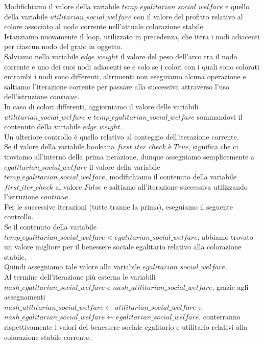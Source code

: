 Modifichiamo il valore della variabile $temp\_egalitarian\_social\_welfare$ e quello della variabile $utilitarian\_social\_welfare$ con il valore del profitto relativo al colore associato al nodo corrente nell'attuale colorazione stabile.\\

Istanziamo nuovamente il loop, utilizzato in precedenza, che itera i nodi adiacenti per ciascun nodo del grafo in oggetto.\\

Salviamo nella variabile $edge\_weight$ il valore del peso dell'arco tra il nodo corrente e uno dei suoi nodi adiacenti se e solo se i colori con i quali sono colorati entrambi i nodi sono differenti, altrimenti non eseguiamo alcuna operazione e saltiamo l'iterazione corrente per passare alla successiva attraverso l'uso dell'istruzione $continue$.\\
In caso di colori differenti, aggiorniamo il valore delle variabili \\
$utilitarian\_social\_welfare$ e $temp\_egalitarian\_social\_welfare$ sommandovi il contenuto della variabile $edge\_weight$.\\

Un ulteriore controllo è quello relativo al conteggio dell'iterazione corrente.\\
Se il valore della variabile booleana $first\_iter\_check$ è $True$, significa che ci troviamo all'interno della prima iterazione, dunque assegniamo semplicemente a $egalitarian\_social\_welfare$ il valore della variabile \\
$temp\_egalitarian\_social\_welfare$, modifichiamo il contenuto della variabile $first\_iter\_check$ al valore $False$ e saltiamo all'iterazione successiva utilizzando l'istruzione $continue$.\\

Per le successive iterazioni (tutte tranne la prima), eseguiamo il seguente controllo.\\
Se il contenuto della variabile \\
$temp\_egalitarian\_social\_welfare < egalitarian\_social\_welfare$, abbiamo trovato un valore migliore per il benessere sociale egalitario relativo alla colorazione stabile.\\
Quindi assegniamo tale valore alla variabile $egalitarian\_social\_welfare$.\\

Al termine dell'iterazione più esterna le variabili \\
$nash\_egalitarian\_social\_welfare$ e $nash\_utilitarian\_social\_welfare$, grazie agli assegnamenti \\
$nash\_utilitarian\_social\_welfare\gets utilitarian\_social\_welfare$ e \\
$nash\_egalitarian\_social\_welfare\gets egalitarian\_social\_welfare$, conterranno rispettivamente i valori del benessere sociale egalitario e utilitario relativi alla colorazione stabile corrente.\\

